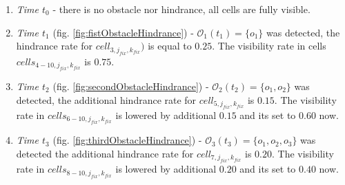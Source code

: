 \begin{enumerate}
    \item\emph{Time $t_0$} - there is no obstacle nor hindrance, all cells are fully visible.

    \item\emph{Time $t_1$} (fig. \ref{fig:fistObstacleHindrance}) - $\mathscr{O}_1(t_1)=\{o_1\}$ was detected, the hindrance rate  for $cell_{3,j_{fix},k_{fix}})$ is equal to $0.25$. The visibility rate in cells $cells_{4-10,j_{fix},k_{fix}}$ is $0.75$. 
    
    \item\emph{Time $t_2$} (fig. \ref{fig:secondObstacleHindrance}) - $\mathscr{O}_2(t_2)=\{o_1,o_2\}$ was detected, the additional hindrance rate for $cell_{5,j_{fix},k_{fix}}$ is $0.15$. The visibility rate in  $cells_{6-10,j_{fix},k_{fix}}$ is lowered by additional $0.15$ and its set to $0.60$ now.
    
    \item\emph{Time $t_3$} (fig. \ref{fig:thirdObstacleHindrance}) - $\mathscr{O}_3(t_3)=\{o_1,o_2,o_3\}$  was detected the additional hindrance rate for  $cell_{7,j_{fix},k_{fix}}$ is $0.20$. The visibility rate in $cells_{8-10,j_{fix},k_{fix}}$ is lowered by additional $0.20$ and its set to $0.40$  now.
\end{enumerate}